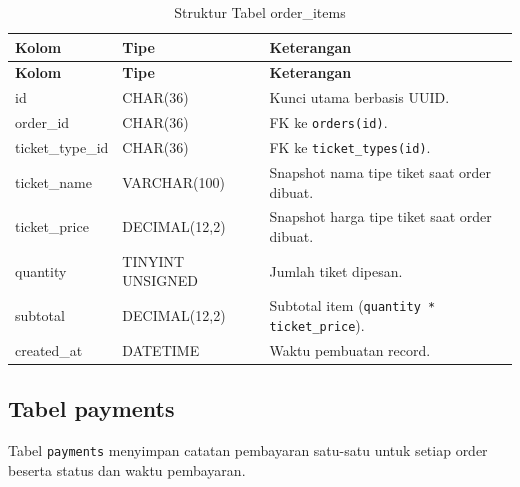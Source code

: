 \documentclass[12pt,a4paper]{report}
\begin{document}
\begin{longtable}{p{3.6cm} p{3.6cm} p{8.5cm}}
\caption{Struktur Tabel order\_items} \label{tab:order-items} \\
\toprule
\textbf{Kolom} & \textbf{Tipe} & \textbf{Keterangan} \\
\midrule
\endfirsthead
\toprule
\textbf{Kolom} & \textbf{Tipe} & \textbf{Keterangan} \\
\midrule
\endhead
\bottomrule
\endfoot
id              & CHAR(36)        & Kunci utama berbasis UUID. \\
order\_id       & CHAR(36)        & FK ke \texttt{orders(id)}. \\
ticket\_type\_id & CHAR(36)       & FK ke \texttt{ticket\_types(id)}. \\
ticket\_name    & VARCHAR(100)    & Snapshot nama tipe tiket saat order dibuat. \\
ticket\_price   & DECIMAL(12,2)   & Snapshot harga tipe tiket saat order dibuat. \\
quantity        & TINYINT UNSIGNED & Jumlah tiket dipesan. \\
subtotal        & DECIMAL(12,2)   & Subtotal item (\texttt{quantity * ticket\_price}). \\
created\_at     & DATETIME        & Waktu pembuatan record. \\
\end{longtable}

\subsection{Tabel payments}
Tabel \texttt{payments} menyimpan catatan pembayaran satu-satu untuk setiap order beserta status dan waktu pembayaran.
\end{document}
